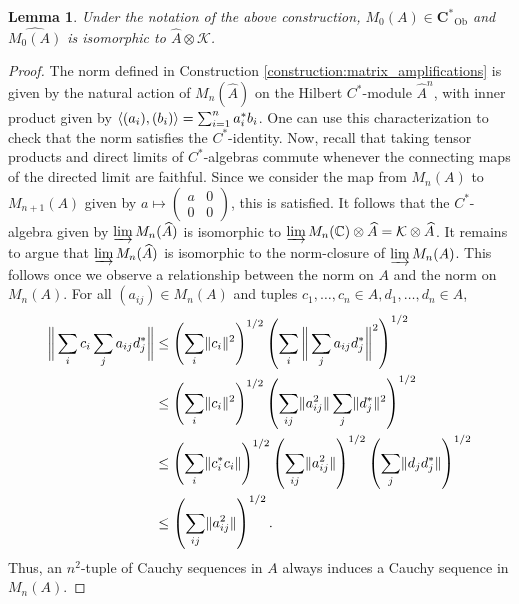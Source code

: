 \documentclass[12pt]{amsart}
\newtheorem{lemma}[theorem]{Lemma}
\DeclareMathOperator{\Ob}{Ob}
\newcommand{\Cstar}{\mathbf{C^*}} %
\newcommand{\fancyK}{\mathcal{K}}
\DeclarePairedDelimiter{\ip}{\langle}{\rangle}
\DeclarePairedDelimiter{\norm}{\lVert}{\rVert}
\begin{document}
\begin{lemma}\label{lemma:matrix_amplifications_description}
    Under the notation of the above construction, $M_0(A) \in \Cstar_{\Ob}$ and $\widehat{M_0(A)}$ is isomorphic to $\widehat{A} \otimes \fancyK$.
\end{lemma}
\begin{proof}
    The norm defined in Construction \ref{construction:matrix_amplifications} is given by the natural action of $M_n(\widehat{A})$ on the Hilbert $C^*$-module $\widehat{A}^n$, with inner product given by $\ip{(a_i), (b_i)} = \sum_{i=1}^n a_i^* b_i$. 
    One can use this characterization to check that the norm satisfies the $C^*$-identity. 
    Now, recall that taking tensor products and direct limits of $C^*$-algebras commute whenever the connecting maps of the directed limit are faithful. Since we consider the map from $M_n(A)$ to $M_{n+1}(A)$ given by $a \mapsto \begin{pmatrix} a & 0 \\ 0 & 0 \end{pmatrix}$, this is satisfied. It follows that the $C^*$-algebra given by $\varinjlim M_n(\widehat{A})$ is isomorphic to $\varinjlim M_n(\mathbb{C}) \otimes \widehat{A} = \mathcal{K} \otimes \widehat{A}$. It remains to argue that $\varinjlim M_n(\widehat{A})$ is isomorphic to the norm-closure of $\varinjlim M_n(A)$. This follows once we observe a relationship between the norm on $A$ and the norm on $M_n(A)$. For all $(a_{ij}) \in M_n(A)$ and tuples $c_1, \dots, c_n \in A, d_1, \dots, d_n \in A$, 
    \begin{align*}
        \bigg\| \sum_i c_i \sum_j a_{ij} d_j^* \bigg\| &\leq \left(\sum_i \norm{c_i}^2 \right)^{1/2}  \left( \sum_i \bigg\| \sum_j a_{ij} d_j^* \bigg\| ^2 \right) ^{1/2} \\
        &\leq \left(\sum_i \norm{c_i}^2 \right)^{1/2} \left( \sum_{ij} \norm{a_{ij}^2} \sum_j \norm{d_j^*}^2 \right)^{1/2} \\
        &\leq \left(\sum_i \norm{c_i^* c_i} \right)^{1/2} \left( \sum_{ij} \norm{a_{ij}^2} \right)^{1/2} \left( \sum_j \norm{d_j d_j^*} \right)^{1/2} \\
        &\leq \left( \sum_{ij} \norm{a_{ij}^2} \right)^{1/2}.
    \end{align*} 
    Thus, an $n^2$-tuple of Cauchy sequences in $A$ always induces a Cauchy sequence in $M_n(A)$.
\end{proof}
\end{document}
